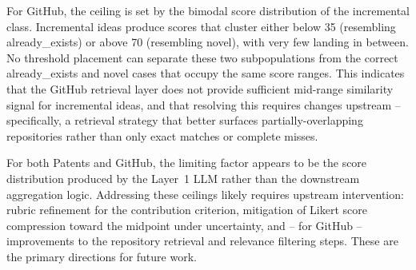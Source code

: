 For GitHub, the ceiling is set by the bimodal score distribution of the incremental class. Incremental ideas produce scores that cluster either below 35 (resembling already\_exists) or above 70 (resembling novel), with very few landing in between. No threshold placement can separate these two subpopulations from the correct already\_exists and novel cases that occupy the same score ranges. This indicates that the GitHub retrieval layer does not provide sufficient mid-range similarity signal for incremental ideas, and that resolving this requires changes upstream -- specifically, a retrieval strategy that better surfaces partially-overlapping repositories rather than only exact matches or complete misses.
 
For both Patents and GitHub, the limiting factor appears to be the score distribution produced by the Layer~1 LLM rather than the downstream aggregation logic. Addressing these ceilings likely requires upstream intervention: rubric refinement for the contribution criterion, mitigation of Likert score compression toward the midpoint under uncertainty, and -- for GitHub -- improvements to the repository retrieval and relevance filtering steps. These are the primary directions for future work.

